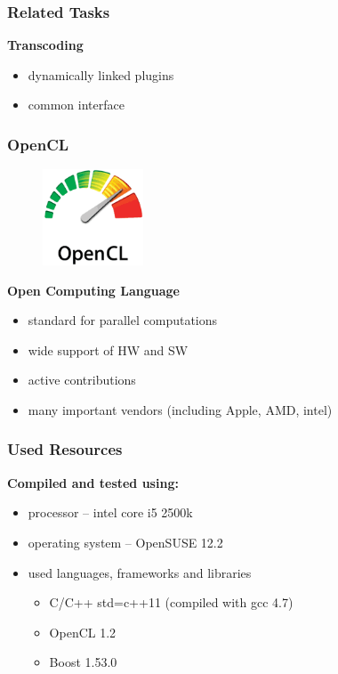 \documentclass[10pt, xcolor=pdflatex, dvipsnames, table]{beamer}
\begin{document}
\frame[plain]{\bluepage{}}

\begin{frame}
\frametitle{Related Tasks}
\textbf{Transcoding}
\begin{itemize}
\item dynamically linked plugins
\item common interface
\end{itemize}
\end{frame}

\begin{frame}
\frametitle{OpenCL}
\begin{figure}
\includegraphics[width=3cm]{img/OpenCL_Logo.png}
\end{figure}
\textbf{Open Computing Language} 
\begin{itemize}
\item standard for parallel computations
\item wide support of HW and SW
\item active contributions 
\item many important vendors (including Apple, AMD, intel)
\end{itemize} 
\end{frame}

\begin{frame}
\frametitle{Used Resources}
\textbf{Compiled and tested using:}
\begin{itemize}
\item processor -- intel core i5 2500k
\item operating system -- OpenSUSE 12.2
\item used languages, frameworks and libraries 
  \begin{itemize}
  \item C/C++ std=c++11 (compiled with gcc 4.7)
  \item OpenCL 1.2
  \item Boost 1.53.0
  \end{itemize}
\end{itemize}
\end{frame}
\end{document}
